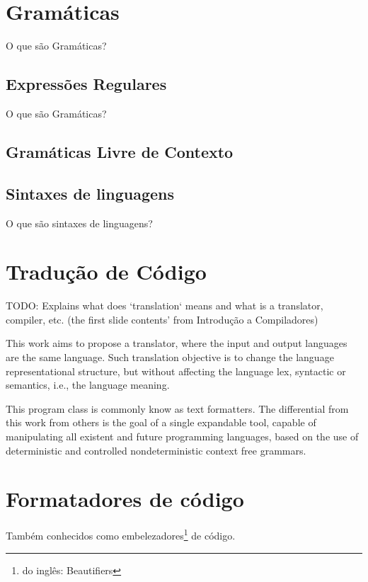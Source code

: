 \section{Gramáticas}

O que são Gramáticas?


\subsection{Expressões Regulares}

O que são Gramáticas?


\subsection{Gramáticas Livre de Contexto}


\subsection{Sintaxes de linguagens}

O que são sintaxes de linguagens?


\section{Tradução de Código}

TODO:
Explains what does `translation` means and what is a translator,
compiler,
etc.
(the first slide contents' from Introdução a Compiladores)

This work aims to propose a translator,
where the input and output languages are the same language.
Such translation objective is to change the language representational structure,
but without affecting the language lex,
syntactic or semantics, i.e.,
the language meaning.

This program class is commonly know as text formatters.
The differential from this work from others is the goal of a single expandable tool,
capable of manipulating all existent and future programming languages,
based on the use of deterministic
and controlled nondeterministic
context free grammars.


\section{Formatadores de código}

Também conhecidos como embelezadores\footnote{do inglês:
Beautifiers} de código.


